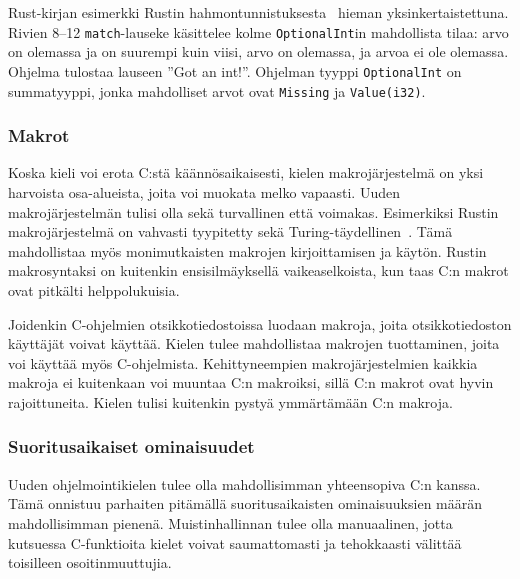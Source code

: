 \FloatBarrier

\begin{listing}[ht!]
    \inputminted{Rust}{guards.rs}
    \caption{Rust-kirjan esimerkki Rustin
    hahmontunnistuksesta~\citep{rustguards} hieman yksinkertaistettuna. Rivien
    8--12 \texttt{match}-lauseke käsittelee kolme \texttt{OptionalInt}in
    mahdollista tilaa: arvo on olemassa ja on suurempi kuin viisi, arvo on
    olemassa, ja arvoa ei ole olemassa. Ohjelma tulostaa lauseen ''Got an
    int!''. Ohjelman tyyppi \texttt{OptionalInt} on summatyyppi, jonka
    mahdolliset arvot ovat \texttt{Missing} ja \texttt{Value(i32)}.}
    \label{fig:guards}
\end{listing}

\FloatBarrier

\subsubsection{Makrot}

Koska kieli voi erota C:stä käännösaikaisesti, kielen makrojärjestelmä on yksi
harvoista osa-alueista, joita voi muokata melko vapaasti. Uuden
makrojärjestelmän tulisi olla sekä turvallinen että voimakas. Esimerkiksi
Rustin makrojärjestelmä on vahvasti tyypitetty sekä
Turing-täydellinen~\citep{rustmacros}. Tämä mahdollistaa myös monimutkaisten
makrojen kirjoittamisen ja käytön. Rustin makrosyntaksi on kuitenkin
ensisilmäyksellä vaikeaselkoista, kun taas C:n makrot ovat pitkälti
helppolukuisia.

Joidenkin C-ohjelmien otsikkotiedostoissa luodaan makroja, joita
otsikkotiedoston käyttäjät voivat käyttää. Kielen tulee mahdollistaa makrojen
tuottaminen, joita voi käyttää myös C-ohjelmista. Kehittyneempien
makrojärjestelmien kaikkia makroja ei kuitenkaan voi muuntaa C:n makroiksi,
sillä C:n makrot ovat hyvin rajoittuneita. Kielen tulisi kuitenkin pystyä
ymmärtämään C:n makroja.

\subsubsection{Suoritusaikaiset ominaisuudet}

Uuden ohjelmointikielen tulee olla mahdollisimman yhteensopiva C:n kanssa. Tämä
onnistuu parhaiten pitämällä suoritusaikaisten ominaisuuksien määrän mahdollisimman
pienenä. Muistinhallinnan tulee olla manuaalinen, jotta kutsuessa C-funktioita
kielet voivat saumattomasti ja tehokkaasti välittää toisilleen
osoitinmuuttujia.


